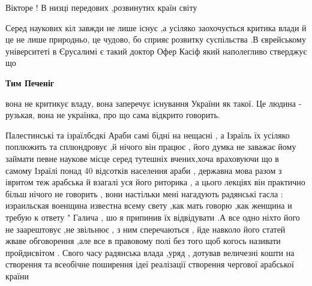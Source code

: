 \begin{itemize}
\begin{itemize}
 
Вікторе ! В низці передових ,розвинутих країн світу

 

Серед наукових кіл завжди не лише існує ,а усіляко заохочується критика влади й
це не лише природньо, це чудово, бо сприяє розвитку суспільства .В єврейському
університеті в Єрусалимі є такий доктор Офер Касіф який наполегливо стверджує
що

 
\textbf{Тим Печеніг} 

вона не критикує владу, вона заперечує існування України як такої. Це людина -
рузькая, вона не українка, про що сама відкрито говорить.

 
Палестинські та ізраїлбсдкі Араби самі бідні на нещасні , а Ізраїль їх усіляко
поплюжить та сплюндровує ,й нічого він працює , його думка не заважає йому
займати певне наукове місце серед тутешніх вчених,хоча враховуючи що в самому
Ізраїлі понад 40 відсотків населення араби , державна мова разом з івритом теж
арабська й взагалі уся його риторика , а цього лекціях він практично більш
нічого не говорить , вони настільки мені нагадують радянські гасла :
израильская военщина известна всему свету ,как мать говорю ,как женщина и
требую к ответу " Галича , шо я припинив їх відвідувати .А все одно ніхто його
не заарештовує ,не звільнює , з ним сперечаються , йде навколо його статей
жваве обговорення ,але все в правовому полі без того щоб когось називати
пройдисвітом . Свого часу радянська влада ,уряд , дотував величезні кошти на
створення та всеобічне поширення ідеї реалізації створення чергової арабської
країни


\end{itemize}
\end{itemize}
